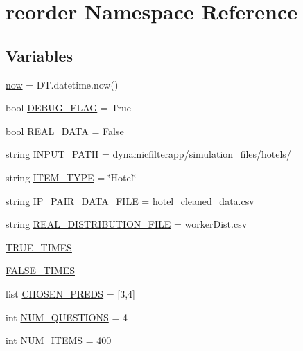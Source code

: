 \hypertarget{namespacereorder}{}\section{reorder Namespace Reference}
\label{namespacereorder}
\subsection*{Variables}
\begin{DoxyCompactItemize}
\item 
\hyperlink{namespacereorder_afdc24ca189ea1f66dfd9245b4c970d59}{now} = D\+T.\+datetime.\+now()
\item 
bool \hyperlink{namespacereorder_a5c62a4f8ba41755a0f5e48c54c4705b8}{D\+E\+B\+U\+G\+\_\+\+F\+L\+AG} = True
\item 
bool \hyperlink{namespacereorder_a00674fe8ef8f59b37d7fe239813bb627}{R\+E\+A\+L\+\_\+\+D\+A\+TA} = False
\item 
string \hyperlink{namespacereorder_aca6b14e235be3a92f729918cfcfed5e5}{I\+N\+P\+U\+T\+\_\+\+P\+A\+TH} = \textquotesingle{}dynamicfilterapp/simulation\+\_\+files/hotels/\textquotesingle{}
\item 
string \hyperlink{namespacereorder_ab7ef0f87c772b28128250ee46f5390ab}{I\+T\+E\+M\+\_\+\+T\+Y\+PE} = \char`\"{}Hotel\char`\"{}
\item 
string \hyperlink{namespacereorder_a43d654f8629542974ec1db04c0fc580a}{I\+P\+\_\+\+P\+A\+I\+R\+\_\+\+D\+A\+T\+A\+\_\+\+F\+I\+LE} = \textquotesingle{}hotel\+\_\+cleaned\+\_\+data.\+csv\textquotesingle{}
\item 
string \hyperlink{namespacereorder_ad581376e3eb6ca15bbbe096863891cec}{R\+E\+A\+L\+\_\+\+D\+I\+S\+T\+R\+I\+B\+U\+T\+I\+O\+N\+\_\+\+F\+I\+LE} = \textquotesingle{}worker\+Dist.\+csv\textquotesingle{}
\item 
\hyperlink{namespacereorder_a6794acc9ab30adea862f4077cf9adae7}{T\+R\+U\+E\+\_\+\+T\+I\+M\+ES}
\item 
\hyperlink{namespacereorder_a809d01bf46cd20093532e7cbc0960874}{F\+A\+L\+S\+E\+\_\+\+T\+I\+M\+ES}
\item 
list \hyperlink{namespacereorder_a4cf7283f335a2c863799ccaca109e4c9}{C\+H\+O\+S\+E\+N\+\_\+\+P\+R\+E\+DS} = \mbox{[}3,4\mbox{]}
\item 
int \hyperlink{namespacereorder_a6e9b8f89b507e81efe828c45c51e3906}{N\+U\+M\+\_\+\+Q\+U\+E\+S\+T\+I\+O\+NS} = 4
\item 
int \hyperlink{namespacereorder_a0948720f253a5f2fc7689b2968c8b619}{N\+U\+M\+\_\+\+I\+T\+E\+MS} = 400

\end{DoxyCompactItemize}
